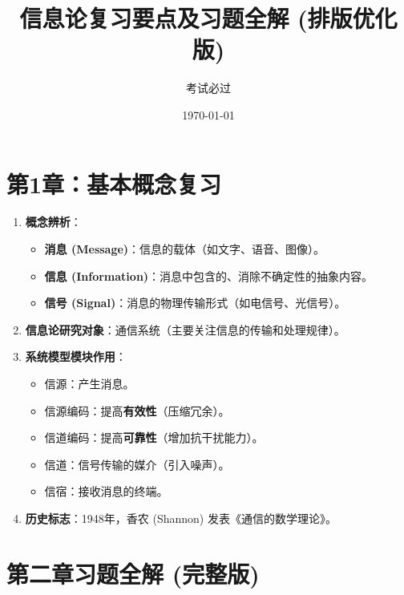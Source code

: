 \documentclass[11pt, a4paper]{article}
\title{\textbf{信息论复习要点及习题全解 (排版优化版)}}
\author{考试必过}
\date{\today}
\begin{document}
\maketitle
\tableofcontents
\newpage

\section{第1章：基本概念复习}

\begin{enumerate}
    \item \textbf{概念辨析}：
    \begin{itemize}
        \item \textbf{消息 (Message)}：信息的载体（如文字、语音、图像）。
        \item \textbf{信息 (Information)}：消息中包含的、消除不确定性的抽象内容。
        \item \textbf{信号 (Signal)}：消息的物理传输形式（如电信号、光信号）。
    \end{itemize}
    
    \item \textbf{信息论研究对象}：通信系统（主要关注信息的传输和处理规律）。
    
    \item \textbf{系统模型模块作用}：
    \begin{itemize}
        \item 信源：产生消息。
        \item 信源编码：提高\textbf{有效性}（压缩冗余）。
        \item 信道编码：提高\textbf{可靠性}（增加抗干扰能力）。
        \item 信道：信号传输的媒介（引入噪声）。
        \item 信宿：接收消息的终端。
    \end{itemize}
    
    \item \textbf{历史标志}：1948年，香农 (Shannon) 发表《通信的数学理论》。
\end{enumerate}

\section{第二章习题全解 (完整版)}
\end{document}
